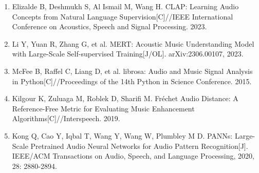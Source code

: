 \documentclass[UTF8,a4paper,zihao=-4,fontset=none]{ctexart}
\begin{document}
\begin{enumerate}[leftmargin=2em]
\item Elizalde B, Deshmukh S, Al Ismail M, Wang H. CLAP: Learning Audio Concepts from Natural Language Supervision[C]//IEEE International Conference on Acoustics, Speech and Signal Processing. 2023.
\item Li Y, Yuan R, Zhang G, et al. MERT: Acoustic Music Understanding Model with Large-Scale Self-supervised Training[J/OL]. arXiv:2306.00107, 2023.
\item McFee B, Raffel C, Liang D, et al. librosa: Audio and Music Signal Analysis in Python[C]//Proceedings of the 14th Python in Science Conference. 2015.
\item Kilgour K, Zuluaga M, Roblek D, Sharifi M. Fréchet Audio Distance: A Reference-Free Metric for Evaluating Music Enhancement Algorithms[C]//Interspeech. 2019.
\item Kong Q, Cao Y, Iqbal T, Wang Y, Wang W, Plumbley M D. PANNs: Large-Scale Pretrained Audio Neural Networks for Audio Pattern Recognition[J]. IEEE/ACM Transactions on Audio, Speech, and Language Processing, 2020, 28: 2880-2894.
\end{enumerate}
\end{document}
